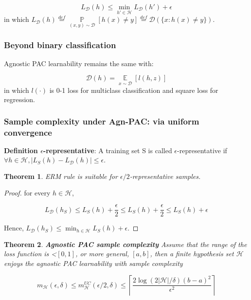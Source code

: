 \documentclass{article}
\newtheorem{theorem}{Theorem}
\newtheorem*{proof}{Proof}
\begin{document}
	\begin{equation*}
	L_\mathcal{D}(h)\leq\min\limits_{h'\in\mathcal{H}}L_\mathcal{D}(h')+\epsilon
	\end{equation*}
in which $L_\mathcal{D}(h)\overset{def}{=}\mathop{\mathbb{P}}\limits_{(x,y)\sim\mathcal{D}}[h(x)\neq y]\overset{def}{=}\mathcal{D}(\{x:h(x)\neq y\})$.

	\subsubsection{Beyond binary classification}

	
	Agnostic PAC learnability remains the same with:
	
	\begin{equation}
	\mathcal{D}(h)=\mathop{\mathbb{E}}\limits_{x\sim\mathcal{D}}[l(h,z)]
	\end{equation}
in which $l(\cdot)$ is 0-1 loss for multiclass classification and square loss for regression. 

	\subsubsection{Sample complexity under Agn-PAC: via uniform convergence}
	
	\textbf{Definition $\epsilon$-representative}: A training set S is called $\epsilon$-representative if $\forall h\in\mathcal{H},|L_S(h)-L_\mathcal{D}(h)|\leq\epsilon$.
	
	\begin{theorem}
	ERM rule is suitable for $\epsilon/2$-representative samples.
	\end{theorem}
	
	\begin{proof}
	for every $h\in\mathcal{H}$,
	
	\begin{equation}
	L_\mathcal{D}(h_S)\leq L_S(h)+\frac{\epsilon}{2}\leq L_S(h)+\frac{\epsilon}{2}\leq L_S(h)+\epsilon
	\end{equation}	 

	Hence, $L_\mathcal{D}(h_S)\leq \min_{h\in\mathcal{H}}L_S(h)+\epsilon$.
	\end{proof}

	\begin{theorem}
	\textbf{Agnostic PAC sample complexity} Assume that the range of the loss function is <$[0,1]$, or more general, $[a,b]$, then a finite hypothesis set $\mathcal{H}$ enjoys the agnostic PAC learnability with sample complexity 
	
	\begin{equation}
	m_\mathcal{H}(\epsilon,\delta)\leq m^{UC}_\mathcal{H}(\epsilon/2,\delta)\leq\left\lceil\frac{2\log(2|\mathcal{H}|/\delta)(b-a)^2}{\epsilon^2}\right\rceil
	\end{equation}
	\end{theorem}
\end{document}
